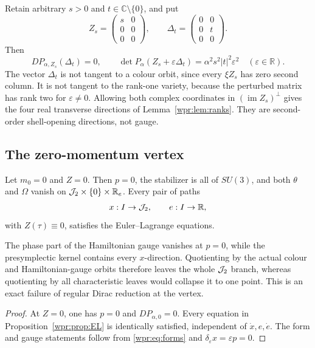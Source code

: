 \begin{counterexample}
\label{wpr:ce:transverse}
Retain arbitrary \(s>0\) and \(t\in\mathbb C\setminus\{0\}\), and put
\[
 Z_s=\begin{pmatrix}s&0\\0&0\\0&0\end{pmatrix},\qquad
 \Delta_t=\begin{pmatrix}0&0\\0&t\\0&0\end{pmatrix}.
\]
Then
\begin{equation}
 D P_{\alpha,Z_s}(\Delta_t)=0,\qquad
 \det P_\alpha(Z_s+\varepsilon\Delta_t)
 =\alpha^2s^2|t|^2\varepsilon^2
 \quad(\varepsilon\in\mathbb R).
 \label{wpr:eq:transverse}
\end{equation}
The vector \(\Delta_t\) is not tangent to a colour orbit, since every
\(\xi Z_s\) has zero second column.  It is not tangent to the rank-one
variety, because the perturbed matrix has rank two for
\(\varepsilon\neq0\).  Allowing both complex coordinates in
\((\operatorname{im}Z_s)^\perp\) gives the four real transverse
directions of Lemma~\ref{wpr:lem:ranks}.  They are second-order
shell-opening directions, not gauge.
\end{counterexample}

\subsection{The zero-momentum vertex}
\begin{theorem}
\label{wpr:thm:zero}
Let \(m_0=0\) and \(Z=0\).  Then \(p=0\), the stabilizer is all of
\(SU(3)\), and both \(\theta\) and \(\Omega\) vanish on
\(\mathcal J_2\times\{0\}\times\mathbb R_e\).  Every pair of paths
\[
 x:I\to\mathcal J_2,\qquad e:I\to\mathbb R,
\]
with \(Z(\tau)\equiv0\), satisfies the Euler--Lagrange equations.

The phase part of the Hamiltonian gauge vanishes at \(p=0\), while the
presymplectic kernel contains every \(x\)-direction.  Quotienting by
the actual colour and Hamiltonian-gauge orbits therefore leaves the
whole \(\mathcal J_2\) branch, whereas quotienting by all characteristic leaves
would collapse it to one point.  This is an exact failure of regular
Dirac reduction at the vertex.
\end{theorem}
\begin{proof}
At \(Z=0\), one has \(p=0\) and \(D P_{\alpha,0}=0\).  Every equation
in Proposition~\ref{wpr:prop:EL} is identically satisfied, independent
of \(\dot x,e,\dot e\).  The form and gauge statements follow from
\eqref{wpr:eq:forms} and
\(\delta_\varepsilon x=\varepsilon p=0\).
\end{proof}

